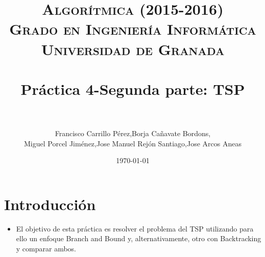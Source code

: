 
 \usepackage{algpseudocode}

\title{	
\normalfont \normalsize 
\textsc{{\bf Algorítmica (2015-2016)} \\ Grado en Ingeniería Informática \\ Universidad de Granada} \\ [25pt] %
\horrule{0.5pt} \\[0.4cm] %
\huge Práctica 4-Segunda parte: TSP \\ %
\horrule{2pt} \\[0.5cm] %
}

\author{Francisco Carrillo Pérez,Borja Cañavate Bordons, \\Miguel Porcel Jiménez,Jose Manuel Rejón Santiago,Jose Arcos Aneas} %

\date{\normalsize\today} %




\maketitle %

\newpage %

\tableofcontents %

\listoffigures

\listoftables

\newpage
	
	\section{Introducción }

		\begin{itemize}
			\item El objetivo de esta práctica es resolver el problema del TSP utilizando para ello un enfoque Branch and Bound y, alternativamente, otro con Backtracking y comparar ambos.
		\end{itemize}

